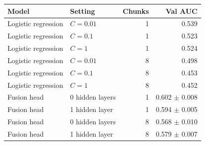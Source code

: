 \begin{tabular}{llrr}
\toprule
Model & Setting & Chunks & Val AUC \\
\midrule
Logistic regression & $C=0.01$ & 1 & 0.539 \\
Logistic regression & $C=0.1$ & 1 & 0.523 \\
Logistic regression & $C=1$ & 1 & 0.524 \\
Logistic regression & $C=0.01$ & 8 & 0.498 \\
Logistic regression & $C=0.1$ & 8 & 0.453 \\
Logistic regression & $C=1$ & 8 & 0.452 \\
\midrule
Fusion head & 0 hidden layers & 1 & 0.602 $\pm$ 0.008 \\
Fusion head & 1 hidden layer & 1 & 0.594 $\pm$ 0.005 \\
Fusion head & 0 hidden layers & 8 & 0.568 $\pm$ 0.010 \\
Fusion head & 1 hidden layer & 8 & 0.579 $\pm$ 0.007 \\
\bottomrule
\end{tabular}
